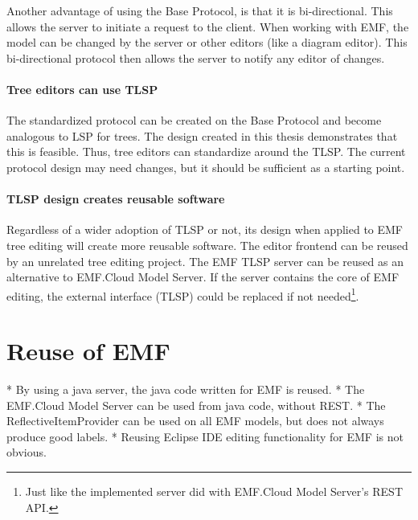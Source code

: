 Another advantage of using the Base Protocol, is that it is bi-directional.
This allows the server to initiate a request to the client.
When working with \acrshort{EMF}, the model can be changed by the server or other editors (like a diagram editor).
This bi-directional protocol then allows the server to notify any editor of changes.

\paragraph{Tree editors can use TLSP}
The standardized protocol can be created on the Base Protocol and become analogous to \acrshort{LSP} for trees.
The design created in this thesis demonstrates that this is feasible.
Thus, tree editors can standardize around the \acrfull{TLSP}.
The current protocol design may need changes, but it should be sufficient as a starting point.

\paragraph{TLSP design creates reusable software}
Regardless of a wider adoption of \acrshort{TLSP} or not, its design when applied to \acrshort{EMF} tree editing will create more reusable software.
The editor frontend can be reused by an unrelated tree editing project.
The \acrshort{EMF} \acrshort{TLSP} server can be reused as an alternative to EMF.Cloud Model Server.
If the server contains the core of \acrshort{EMF} editing, the external interface (\acrshort{TLSP}) could be replaced if not needed\footnote{Just like the implemented server did with EMF.Cloud Model Server's \gls{REST} \acrshort{API}.}.


\section{Reuse of EMF}
* By using a java server, the java code written for EMF is reused.
* The EMF.Cloud Model Server can be used from java code, without REST.
* The ReflectiveItemProvider can be used on all \acrshort{EMF} models, but does not always produce good labels.
* Reusing Eclipse IDE editing functionality for EMF is not obvious.
